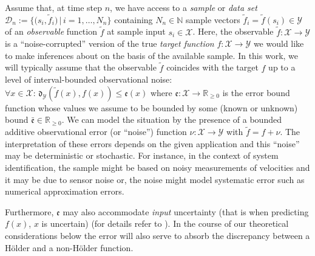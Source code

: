 \documentclass{article} %
\theoremstyle{definition}
\theoremstyle{remark}
\newcommand{\Real}{\mathbb R}
\newcommand{\nat}{\mathbb N}
\newcommand{\data}{\ensuremath{ \mathcal D} }
\newcommand{\inspace}{\ensuremath{ \mathcal X}}
\newcommand{\outspace}{\ensuremath{ \mathcal Y}}
\newcommand{\metric}{\, \mathfrak{d}} %
\newcommand{\noise}{{\nu}} %
\newcommand{\obserrhyprec}{\mathbf  O} %
\newcommand{\obserr}{\mathfrak e} %
\newcommand{\obserrbnd}{\bar{\mathfrak e}}
\begin{document}
Assume that, at time step $n$, we have access to a \textit{sample} or \textit{data set} $\data_n:= \{\bigl( s_i, \tilde f_i \bigr) \, \vert \, i=1,\ldots, N_n \} $ containing $N_n \in \nat$ sample vectors $\tilde f_i = \tilde f(s_i) \in \outspace$ of an \emph{observable}   function $\tilde f$ at sample input $s_i \in \inspace$. Here, the observable $\tilde f : \inspace \to \outspace$ is a ``noise-corrupted'' version of the true \emph{target function} $f: \inspace \to \outspace$ we would like to make inferences about on the basis of the available sample. In this work, we will typically assume that the observable $\tilde f$ coincides with the target $f$ up to a level of interval-bounded observational noise: $\forall x \in \inspace: \metric_\outspace(\tilde f(x),f(x) ) \leq \obserr(x) $ where $\obserr : \inspace \to \Real_{\geq 0}$ is the error bound function whose values we assume to be bounded by some (known or unknown) bound $\obserrbnd \in \Real_{\geq 0}$. We can model the situation by the presence of a bounded additive observational error (or ``noise'') function $\noise:\inspace \to \outspace$ with $\tilde f = f + \noise$.
The interpretation of these errors depends on the given application and this ``noise'' may be deterministic or stochastic. For instance, in the context of system identification, the sample might be based on noisy measurements of velocities and it may be due to sensor noise or, the noise might model systematic error such as numerical approximation errors. 

Furthermore, $\obserr$ may also accommodate \textit{input} uncertainty (that is when predicting $f(x)$, $x$ is uncertain) (for details refer to \cite{calliess2014_thesis}). In the course of our theoretical considerations below the error will also serve to absorb the discrepancy between a H\"older and a non-H\"older function.
%
\end{document}
